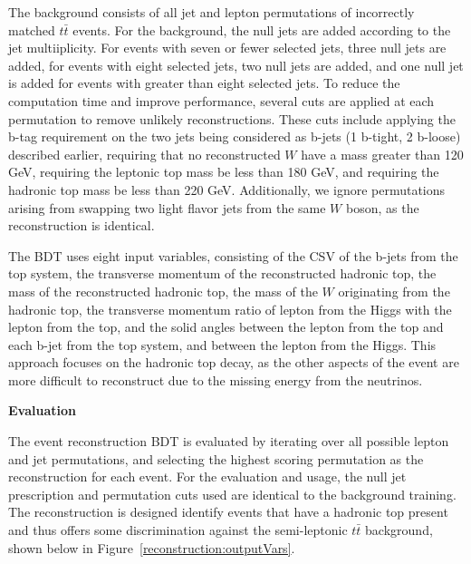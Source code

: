 The background consists of all jet and lepton permutations of incorrectly matched
$t\bar{t}$ events. For the background, the null jets are added according to the
jet multiiplicity. For events with seven or fewer selected jets, three null jets are
added, for events with eight selected jets, two null jets are added, and one null jet
is added for events with greater than eight selected jets. To reduce the computation
time and improve performance,
several cuts are applied at each permutation to remove unlikely reconstructions.
These cuts include applying the b-tag requirement on the two jets being considered
as b-jets (1 b-tight, 2 b-loose) described earlier, requiring that no
reconstructed $W$ have a mass greater than 120 GeV, requiring the leptonic top mass
be less than 180 GeV, and requiring 
the hadronic top mass be less than 220 GeV. Additionally, we ignore permutations
arising from swapping two light flavor jets from the same $W$ boson, as the reconstruction is
identical. 

The BDT uses eight input variables, consisting of the CSV of the b-jets from the top
system, the transverse
momentum of the reconstructed hadronic top, the mass of the reconstructed hadronic top,
the mass of the $W$ originating from the hadronic top, the transverse momentum ratio
of lepton from the Higgs with the lepton from the top, and the solid angles between
the lepton from the top and
each b-jet from the top system, and between the lepton from the Higgs.
This approach focuses on the hadronic top decay, as the other aspects of the event
are more difficult to reconstruct due to the missing energy from the neutrinos. 

{\bfseries Evaluation}

The event reconstruction BDT is evaluated by iterating over all possible lepton and jet
permutations, and selecting the highest scoring permutation as the reconstruction for
each event. For the evaluation and usage, the null jet prescription and permutation
cuts used are identical to the background training.
The reconstruction is designed identify events that have a hadronic top present and thus offers
some discrimination against the semi-leptonic $t\bar{t}$ background, shown below in
Figure~\ref{reconstruction:outputVars}.


